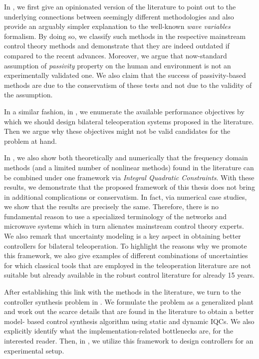 In , we first give an opinionated version of the literature to point out to the underlying connections between 
seemingly different methodologies and also provide an arguably simpler explanation to the well-known \emph{wave variables} formalism. By 
doing so, we classify such methods in the respective mainstream control theory methods and demonstrate that they are indeed outdated if 
compared to the recent advances. Moreover, we argue that now-standard assumption of \emph{passivity} property on the human and 
environment is not an experimentally validated one. We also claim that the success of passivity-based methods are due to the conservatism 
of these tests and not due to the validity of the assumption.

In a similar fashion, in , we enumerate the available performance objectives by which we should design bilateral 
teleoperation systems proposed in the literature. Then we argue why these objectives might not be valid candidates for the problem at hand.

In , we also show both theoretically and numerically that the frequency domain methods (and a limited number of 
nonlinear methods) found in the literature can be combined under one framework via \emph{Integral Quadratic Constraints}. With these 
results, we demonstrate that the proposed framework of this thesis does not bring in additional complications or conservatism. In fact, 
via numerical case studies, we show that the results are precisely the same. Therefore, there is no fundamental reason to use a 
specialized terminology of the networks and microwave systems which in turn alienates mainstream control theory experts. We also remark 
that uncertainty modeling is a key aspect in obtaining better controllers for bilateral teleoperation. To highlight the reasons why we 
promote this framework, we also give examples of different combinations of uncertainties for which classical tools that are employed in 
the teleoperation literature are not suitable but already available in the robust control literature for already 15 years. 


After establishing this link with the methods in the literature, we turn to the controller synthesis problem in . We 
formulate the problem as a generalized plant and work out the scarce details that are found in the literature to obtain a better model-
based control synthesis algorithm using static and dynamic IQCs. We also explicitly identify what the implementation-related bottlenecks 
are, for the interested reader.  Then, in , we utilize this framework to design controllers for an experimental 
setup.

